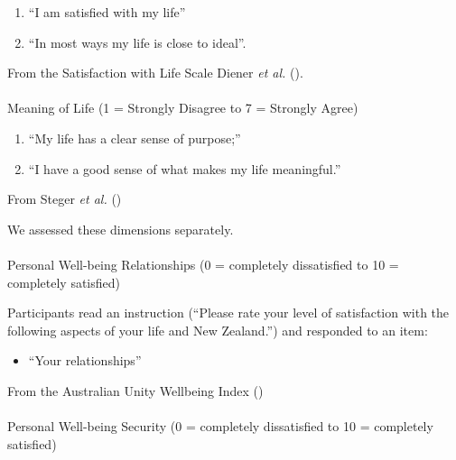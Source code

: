 \documentclass[
  single column]{article}
\makeatletter
\let\oldparagraph\paragraph
\renewcommand{\paragraph}{
    \@ifstar
      \xxxParagraphStar
      \xxxParagraphNoStar
  }
\newcommand{\xxxParagraphStar}[1]{\oldparagraph*{#1}\mbox{}}
\newcommand{\xxxParagraphNoStar}[1]{\oldparagraph{#1}\mbox{}}
\providecommand{\tightlist}{%
  \setlength{\itemsep}{0pt}\setlength{\parskip}{0pt}}\usepackage{longtable,booktabs,array}
\makeatother
\begin{document}
\begin{enumerate}
\def\labelenumi{\arabic{enumi}.}
\tightlist
\item
  ``I am satisfied with my life''\\
\item
  ``In most ways my life is close to ideal''.
\end{enumerate}

From the Satisfaction with Life Scale Diener \emph{et al.}
().

\paragraph{Meaning of Life (1 = Strongly Disagree to 7 = Strongly
Agree)}\label{meaning-of-life-1-strongly-disagree-to-7-strongly-agree}

\begin{enumerate}
\def\labelenumi{(\arabic{enumi})}
\tightlist
\item
  ``My life has a clear sense of purpose;''
\item
  ``I have a good sense of what makes my life meaningful.''
\end{enumerate}

From Steger \emph{et al.} ()

We assessed these dimensions separately.

\paragraph{Personal Well-being Relationships (0 = completely
dissatisfied to 10 = completely
satisfied)}\label{personal-well-being-relationships-0-completely-dissatisfied-to-10-completely-satisfied}

Participants read an instruction (``Please rate your level of
satisfaction with the following aspects of your life and New Zealand.'')
and responded to an item:

\begin{itemize}
\tightlist
\item
  ``Your relationships''
\end{itemize}

From the Australian Unity Wellbeing Index
()

\paragraph{Personal Well-being Security (0 = completely dissatisfied to
10 = completely
satisfied)}\label{personal-well-being-security-0-completely-dissatisfied-to-10-completely-satisfied}
\end{document}
